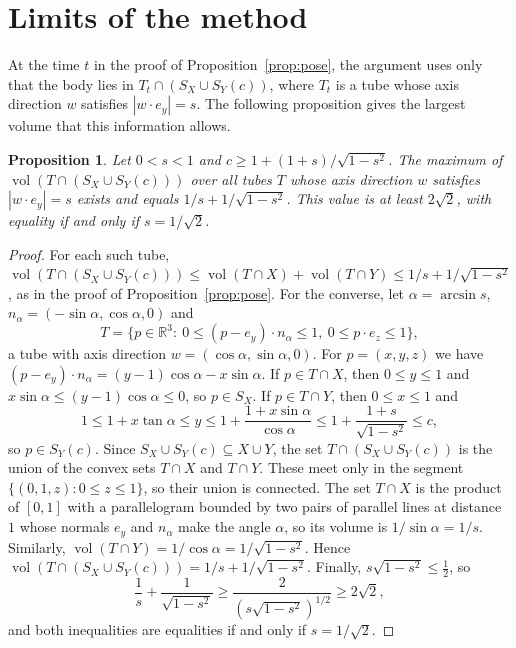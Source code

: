 \documentclass[11pt]{amsart}
\newtheorem{proposition}[theorem]{Proposition}
\theoremstyle{definition}
\theoremstyle{remark}
\numberwithin{equation}{section}
\newcommand{\R}{\mathbb{R}}
\newcommand{\vol}{\operatorname{vol}}
\begin{document}
\section{Limits of the method}\label{sec:limits}

At the time $t$ in the proof of Proposition~\ref{prop:pose}, the argument uses only that the body lies in $T_t\cap(S_X\cup S_Y(c))$, where $T_t$ is a tube whose axis direction $w$ satisfies $|w\cdot e_y|=s$. The following proposition gives the largest volume that this information allows.

\begin{proposition}\label{prop:relax}
Let $0<s<1$ and $c\ge1+(1+s)/\sqrt{1-s^2}$. The maximum of $\vol(T\cap(S_X\cup S_Y(c)))$ over all tubes $T$ whose axis direction $w$ satisfies $|w\cdot e_y|=s$ exists and equals $1/s+1/\sqrt{1-s^2}$. This value is at least $2\sqrt2$, with equality if and only if $s=1/\sqrt2$.
\end{proposition}

\begin{proof}
For each such tube, $\vol(T\cap(S_X\cup S_Y(c)))\le\vol(T\cap X)+\vol(T\cap Y)\le1/s+1/\sqrt{1-s^2}$, as in the proof of Proposition~\ref{prop:pose}. For the converse, let $\alpha=\arcsin s$, $n_\alpha=(-\sin\alpha,\cos\alpha,0)$ and
\[
T=\{p\in\R^3:\ 0\le(p-e_y)\cdot n_\alpha\le1,\ 0\le p\cdot e_z\le1\},
\]
a tube with axis direction $w=(\cos\alpha,\sin\alpha,0)$. For $p=(x,y,z)$ we have $(p-e_y)\cdot n_\alpha=(y-1)\cos\alpha-x\sin\alpha$. If $p\in T\cap X$, then $0\le y\le1$ and $x\sin\alpha\le(y-1)\cos\alpha\le0$, so $p\in S_X$. If $p\in T\cap Y$, then $0\le x\le1$ and
\[
1\le1+x\tan\alpha\le y\le1+\frac{1+x\sin\alpha}{\cos\alpha}\le1+\frac{1+s}{\sqrt{1-s^2}}\le c,
\]
so $p\in S_Y(c)$. Since $S_X\cup S_Y(c)\subseteq X\cup Y$, the set $T\cap(S_X\cup S_Y(c))$ is the union of the convex sets $T\cap X$ and $T\cap Y$. These meet only in the segment $\{(0,1,z):0\le z\le1\}$, so their union is connected. The set $T\cap X$ is the product of $[0,1]$ with a parallelogram bounded by two pairs of parallel lines at distance $1$ whose normals $e_y$ and $n_\alpha$ make the angle $\alpha$, so its volume is $1/\sin\alpha=1/s$. Similarly, $\vol(T\cap Y)=1/\cos\alpha=1/\sqrt{1-s^2}$. Hence $\vol(T\cap(S_X\cup S_Y(c)))=1/s+1/\sqrt{1-s^2}$. Finally, $s\sqrt{1-s^2}\le\frac12$, so
\[
\frac1s+\frac1{\sqrt{1-s^2}}\ge\frac2{(s\sqrt{1-s^2})^{1/2}}\ge2\sqrt2,
\]
and both inequalities are equalities if and only if $s=1/\sqrt2$.
\end{proof}
\end{document}
